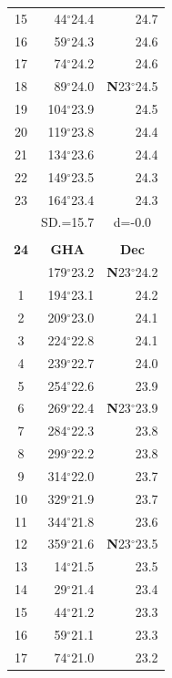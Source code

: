 \documentclass[10pt, a4paper]{report}
\begin{document}
\begin{scriptsize}
\begin{tabular*}{0.2\textwidth}[t]{@{\extracolsep{\fill}}|c|rr|}
15 & 44$^\circ$24.4 & \raisebox{0.24ex}{\boldmath$\cdot$~\boldmath$\cdot$~~}24.7\\
16 & 59$^\circ$24.3 & 24.6\\
17 & 74$^\circ$24.2 & 24.6\\[2Pt]
18 & 89$^\circ$24.0 & \textbf{N}23$^\circ$24.5\\
19 & 104$^\circ$23.9 & 24.5\\
20 & 119$^\circ$23.8 & 24.4\\
21 & 134$^\circ$23.6 & \raisebox{0.24ex}{\boldmath$\cdot$~\boldmath$\cdot$~~}24.4\\
22 & 149$^\circ$23.5 & 24.3\\
23 & 164$^\circ$23.4 & 24.3\\
\hline
\rule{0pt}{2.4ex} & \multicolumn{1}{c}{SD.=15.7} & \multicolumn{1}{c|}{d=-0.0}\\
\hline
\multicolumn{1}{c}{}\\[-0.5ex]\hline
\multicolumn{1}{|c|}{\rule{0pt}{2.6ex}\textbf{24}} & \multicolumn{1}{c}{\textbf{GHA}} & \multicolumn{1}{c|}{\textbf{Dec}}\\
\hline\rule{0pt}{2.6ex}\noindent
0 & 179$^\circ$23.2 & \textbf{N}23$^\circ$24.2\\
1 & 194$^\circ$23.1 & 24.2\\
2 & 209$^\circ$23.0 & 24.1\\
3 & 224$^\circ$22.8 & \raisebox{0.24ex}{\boldmath$\cdot$~\boldmath$\cdot$~~}24.1\\
4 & 239$^\circ$22.7 & 24.0\\
5 & 254$^\circ$22.6 & 23.9\\[2Pt]
6 & 269$^\circ$22.4 & \textbf{N}23$^\circ$23.9\\
7 & 284$^\circ$22.3 & 23.8\\
8 & 299$^\circ$22.2 & 23.8\\
9 & 314$^\circ$22.0 & \raisebox{0.24ex}{\boldmath$\cdot$~\boldmath$\cdot$~~}23.7\\
10 & 329$^\circ$21.9 & 23.7\\
11 & 344$^\circ$21.8 & 23.6\\[2Pt]
12 & 359$^\circ$21.6 & \textbf{N}23$^\circ$23.5\\
13 & 14$^\circ$21.5 & 23.5\\
14 & 29$^\circ$21.4 & 23.4\\
15 & 44$^\circ$21.2 & \raisebox{0.24ex}{\boldmath$\cdot$~\boldmath$\cdot$~~}23.3\\
16 & 59$^\circ$21.1 & 23.3\\
17 & 74$^\circ$21.0 & 23.2\\[2Pt]

\end{tabular*}
\end{scriptsize}
\end{document}
